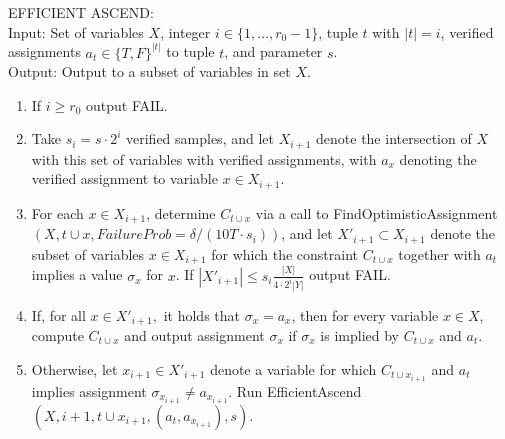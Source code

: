 \documentclass[final,12pt]{colt2018}
\begin{document}
\begin{algorithm}[H]
EFFICIENT ASCEND:\\
Input: Set of variables $X$, integer $i \in \{1,\ldots,r_0-1\}$, tuple $t$ with $|t|=i$, verified assignments $a_t \in \{T,F\}^{|t|}$ to tuple $t$, and parameter $s$.  \\
Output: Output to a subset of variables in set $X$.
\begin{enumerate}
\item If $i \ge r_0$ output FAIL.
\item Take $s_i = s\cdot 2^i$ verified samples, and let $X_{i+1}$ denote the intersection of $X$ with this set of variables with verified assignments, with $a_x$ denoting the verified assignment to variable $x \in X_{i+1}.$  
\item For each $x \in X_{i+1}$, determine $C_{t \cup x}$ via a call to FindOptimisticAssignment$(X,t \cup x, FailureProb=\delta/(10T\cdot s_i))$, and  let $X'_{i+1} \subset X_{i+1}$ denote the subset of variables $x \in X_{i+1}$ for which the  constraint $C_{t \cup x}$ together with $a_t$ implies a value $\sigma_x$ for $x$.   If $|X'_{i+1}| \le s_i \frac{|X|}{4 \cdot 2^{i} |Y|}$ output FAIL.
\item If, for all $x \in X'_{i+1},$ it holds that $\sigma_x = a_x$, then for every variable $x \in X$, compute $C_{t \cup x}$ and output assignment $\sigma_x$ if $\sigma_x$ is implied by $C_{t \cup x}$ and $a_t.$  
\item Otherwise, let $x_{i+1} \in X'_{i+1}$ denote a variable for which $C_{t \cup x_{i+1}}$ and $a_t$ implies assignment $\sigma_{x_{i+1}} \neq a_{x_{i+1}}$.  Run EfficientAscend$(X, i+1, t\cup x_{i+1}, (a_t,a_{x_{i+1}}),s).$
\end{enumerate}
\end{algorithm}
\end{document}
